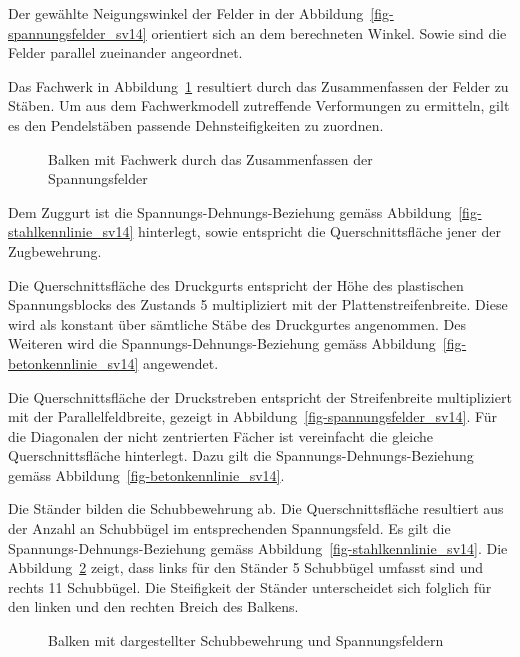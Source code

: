 \documentclass[
  12pt,
  letterpaper,
  egregdoesnotlikesansseriftitles]{scrreprt}
\begin{document}
Der gewählte Neigungswinkel der Felder in der
Abbildung~\ref{fig-spannungsfelder_sv14} orientiert sich an dem
berechneten Winkel. Sowie sind die Felder parallel zueinander
angeordnet.

Das Fachwerk in Abbildung~\ref{fig-fachwerk_sv14} resultiert durch das
Zusammenfassen der Felder zu Stäben. Um aus dem Fachwerkmodell
zutreffende Verformungen zu ermitteln, gilt es den Pendelstäben passende
Dehnsteifigkeiten zu zuordnen.

\begin{figure}[H]


\caption{\label{fig-fachwerk_sv14}Balken mit Fachwerk durch das
Zusammenfassen der Spannungsfelder}

\end{figure}%

Dem Zuggurt ist die Spannungs-Dehnungs-Beziehung gemäss
Abbildung~\ref{fig-stahlkennlinie_sv14} hinterlegt, sowie entspricht die
Querschnittsfläche jener der Zugbewehrung.

Die Querschnittsfläche des Druckgurts entspricht der Höhe des
plastischen Spannungsblocks des Zustands 5 multipliziert mit der
Plattenstreifenbreite. Diese wird als konstant über sämtliche Stäbe des
Druckgurtes angenommen. Des Weiteren wird die
Spannungs-Dehnungs-Beziehung gemäss
Abbildung~\ref{fig-betonkennlinie_sv14} angewendet.

Die Querschnittsfläche der Druckstreben entspricht der Streifenbreite
multipliziert mit der Parallelfeldbreite, gezeigt in
Abbildung~\ref{fig-spannungsfelder_sv14}. Für die Diagonalen der nicht
zentrierten Fächer ist vereinfacht die gleiche Querschnittsfläche
hinterlegt. Dazu gilt die Spannungs-Dehnungs-Beziehung gemäss
Abbildung~\ref{fig-betonkennlinie_sv14}.

Die Ständer bilden die Schubbewehrung ab. Die Querschnittsfläche
resultiert aus der Anzahl an Schubbügel im entsprechenden Spannungsfeld.
Es gilt die Spannungs-Dehnungs-Beziehung gemäss
Abbildung~\ref{fig-stahlkennlinie_sv14}. Die
Abbildung~\ref{fig-schubbew_fw_sv14} zeigt, dass links für den Ständer 5
Schubbügel umfasst sind und rechts 11 Schubbügel. Die Steifigkeit der
Ständer unterscheidet sich folglich für den linken und den rechten
Breich des Balkens.

\begin{figure}[H]


\caption{\label{fig-schubbew_fw_sv14}Balken mit dargestellter
Schubbewehrung und Spannungsfeldern}

\end{figure}%
\end{document}
